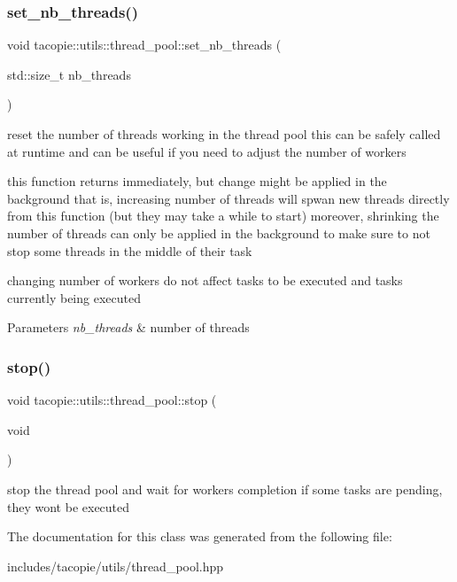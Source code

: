 \subsubsection{\texorpdfstring{set\+\_\+nb\+\_\+threads()}{set\_nb\_threads()}}
{\footnotesize\ttfamily void tacopie\+::utils\+::thread\+\_\+pool\+::set\+\_\+nb\+\_\+threads (\begin{DoxyParamCaption}\item[{std\+::size\+\_\+t}]{nb\+\_\+threads }\end{DoxyParamCaption})}

reset the number of threads working in the thread pool this can be safely called at runtime and can be useful if you need to adjust the number of workers

this function returns immediately, but change might be applied in the background that is, increasing number of threads will spwan new threads directly from this function (but they may take a while to start) moreover, shrinking the number of threads can only be applied in the background to make sure to not stop some threads in the middle of their task

changing number of workers do not affect tasks to be executed and tasks currently being executed


\begin{DoxyParams}{Parameters}
{\em nb\+\_\+threads} & number of threads \\
\hline
\end{DoxyParams}
\mbox{\label{classtacopie_1_1utils_1_1thread__pool_a8874d7040d12fbe446519bc9f2bcff37}} 
\subsubsection{\texorpdfstring{stop()}{stop()}}
{\footnotesize\ttfamily void tacopie\+::utils\+::thread\+\_\+pool\+::stop (\begin{DoxyParamCaption}\item[{void}]{ }\end{DoxyParamCaption})}

stop the thread pool and wait for workers completion if some tasks are pending, they won\textquotesingle{}t be executed 

The documentation for this class was generated from the following file\+:\begin{DoxyCompactItemize}
\item 
includes/tacopie/utils/thread\+\_\+pool.\+hpp\end{DoxyCompactItemize}
